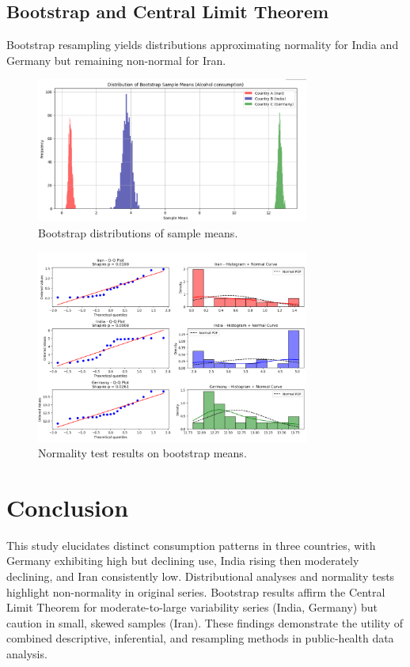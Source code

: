 \documentclass[12pt,a4paper]{article}
\begin{document}
	\subsection{Bootstrap and Central Limit Theorem}
	Bootstrap resampling yields distributions approximating normality for India and Germany but remaining non-normal for Iran.
	
	\begin{figure}[ht]
		\centering
		\includegraphics[width=0.8\textwidth]{figure-7.png}
		\caption{Bootstrap distributions of sample means.}
		\label{fig:bootstrap-dist}
	\end{figure}
	
	\begin{figure}[ht]
		\centering
		\includegraphics[width=0.8\textwidth]{figure-8.png}
		\caption{Normality test results on bootstrap means.}
		\label{fig:bootstrap-normality}
	\end{figure}
	
	\section{Conclusion}
	This study elucidates distinct consumption patterns in three countries, with Germany exhibiting high but declining use, India rising then moderately declining, and Iran consistently low. Distributional analyses and normality tests highlight non-normality in original series. Bootstrap results affirm the Central Limit Theorem for moderate-to-large variability series (India, Germany) but caution in small, skewed samples (Iran). These findings demonstrate the utility of combined descriptive, inferential, and resampling methods in public-health data analysis.
	
\end{document}
